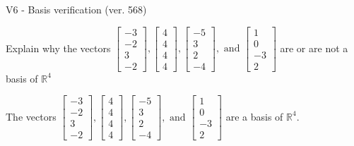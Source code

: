 \begin{exercise}
  \begin{exerciseTitle}V6 - Basis verification (ver. 568)\end{exerciseTitle}
  \begin{exerciseStatement}
    Explain why the vectors \(\left[\begin{array}{r}
-3 \\
-2 \\
3 \\
-2
\end{array}\right] , \left[\begin{array}{r}
4 \\
4 \\
4 \\
4
\end{array}\right] , \left[\begin{array}{r}
-5 \\
3 \\
2 \\
-4
\end{array}\right] , \text{ and } \left[\begin{array}{r}
1 \\
0 \\
-3 \\
2
\end{array}\right]\) are or are not a basis of \(\mathbb{R}^4\)	


  \end{exerciseStatement}
  \begin{exerciseAnswer}
   The vectors \(\left[\begin{array}{r}
-3 \\
-2 \\
3 \\
-2
\end{array}\right] , \left[\begin{array}{r}
4 \\
4 \\
4 \\
4
\end{array}\right] , \left[\begin{array}{r}
-5 \\
3 \\
2 \\
-4
\end{array}\right] , \text{ and } \left[\begin{array}{r}
1 \\
0 \\
-3 \\
2
\end{array}\right]\) 
  	 are  a basis of \(\mathbb{R}^4\).
  


  \end{exerciseAnswer}
\end{exercise}